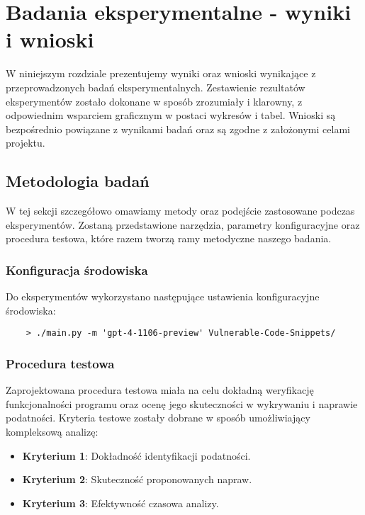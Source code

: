 \chapter{Badania eksperymentalne - wyniki i wnioski}
W niniejszym rozdziale prezentujemy wyniki oraz wnioski wynikające z przeprowadzonych badań eksperymentalnych. Zestawienie rezultatów eksperymentów zostało dokonane w sposób zrozumiały i klarowny, z odpowiednim wsparciem graficznym w postaci wykresów i tabel. Wnioski są bezpośrednio powiązane z wynikami badań oraz są zgodne z założonymi celami projektu.

\section{Metodologia badań}

W tej sekcji szczegółowo omawiamy metody oraz podejście zastosowane podczas eksperymentów. Zostaną przedstawione narzędzia, parametry konfiguracyjne oraz procedura testowa, które razem tworzą ramy metodyczne naszego badania.

\subsection{Konfiguracja środowiska}

Do eksperymentów wykorzystano następujące ustawienia konfiguracyjne środowiska:
\begin{verbatim}
    > ./main.py -m 'gpt-4-1106-preview' Vulnerable-Code-Snippets/
\end{verbatim}

\subsection{Procedura testowa}

Zaprojektowana procedura testowa miała na celu dokładną weryfikację funkcjonalności programu oraz ocenę jego skuteczności w wykrywaniu i naprawie podatności. Kryteria testowe zostały dobrane w sposób umożliwiający kompleksową analizę:

\begin{itemize}
    \item \textbf{Kryterium 1}: Dokładność identyfikacji podatności.
    \item \textbf{Kryterium 2}: Skuteczność proponowanych napraw.
    \item \textbf{Kryterium 3}: Efektywność czasowa analizy.
\end{itemize}

